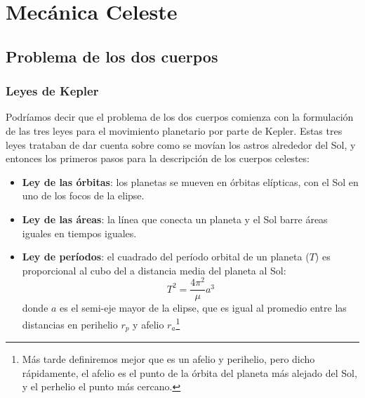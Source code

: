 \chapter{Mecánica Celeste}


\section{Problema de los dos cuerpos}


\subsection{Leyes de Kepler}

Podríamos decir que el problema de los dos cuerpos comienza con la formulación de las tres leyes para el movimiento planetario por parte de Kepler. Estas tres leyes trataban de dar cuenta sobre como se movían los astros alrededor del Sol, y entonces los primeros pasos para la descripción de los cuerpos celestes:

\begin{itemize}
	\item \textbf{Ley de las órbitas}: los planetas se mueven en órbitas elípticas, con el Sol en uno de los focos de la elipse.
	\item \textbf{Ley de las áreas}: la línea que conecta un planeta y el Sol barre áreas iguales en tiempos iguales.
	\item \textbf{Ley de períodos}: el cuadrado del período orbital de un planeta ($T$) es proporcional al cubo del a distancia media del planeta al Sol:
	      \begin{equation}
		      T^2 = \frac{4\pi^2}{\mu}a^3
	      \end{equation}
	      donde $a$ es el semi-eje mayor de la elipse, que es igual al promedio entre las distancias en perihelio $r_p$ y afelio $r_a$\footnote{Más tarde definiremos mejor que es un afelio y perihelio, pero dicho rápidamente, el afelio es el punto de la órbita del planeta más alejado del Sol, y el perhelio el punto más cercano.}
\end{itemize}

